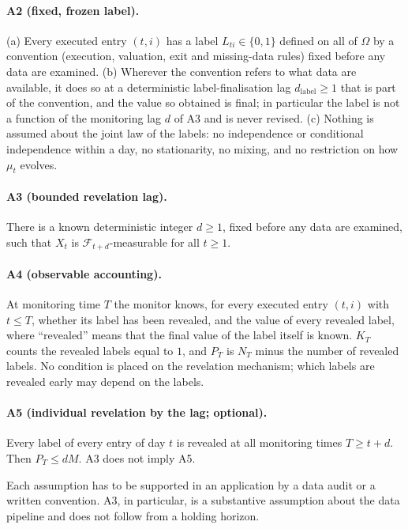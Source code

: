 \documentclass[11pt]{article}
\theoremstyle{remark}
\newcommand{\cF}{\mathcal{F}}
\begin{document}
\paragraph{A2 (fixed, frozen label).}
(a) Every executed entry $(t,i)$ has a label $L_{ti}\in\{0,1\}$ defined on all of $\Omega$ by a
convention (execution, valuation, exit and missing-data rules) fixed before any data are
examined. (b) Wherever the convention refers to what data are available, it does so at a
deterministic label-finalisation lag $d_{\mathrm{label}}\ge1$ that is part of the convention,
and the value so obtained is final; in particular the label is not a function of the monitoring
lag $d$ of A3 and is never revised. (c) Nothing is assumed about the joint law of the labels: no
independence or conditional independence within a day, no stationarity, no mixing, and no
restriction on how $\mu_t$ evolves.

\paragraph{A3 (bounded revelation lag).}
There is a known deterministic integer $d\ge1$, fixed before any data are examined, such that
$X_t$ is $\cF_{t+d}$-measurable for all $t\ge1$.

\paragraph{A4 (observable accounting).}
At monitoring time $T$ the monitor knows, for every executed entry $(t,i)$ with $t\le T$,
whether its label has been revealed, and the value of every revealed label, where ``revealed''
means that the final value of the label itself is known. $K_T$ counts the revealed labels equal
to $1$, and $P_T$ is $N_T$ minus the number of revealed labels. No condition is placed on the
revelation mechanism; which labels are revealed early may depend on the labels.

\paragraph{A5 (individual revelation by the lag; optional).}
Every label of every entry of day $t$ is revealed at all monitoring times $T\ge t+d$. Then
$P_T\le dM$. A3 does not imply A5.

\medskip
Each assumption has to be supported in an application by a data audit or a written convention.
A3, in particular, is a substantive assumption about the data pipeline and does not follow from
a holding horizon.
\end{document}

